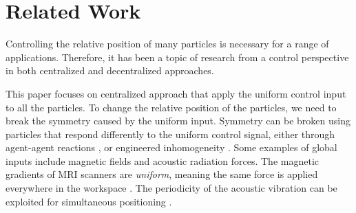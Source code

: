 
\section{Related Work}\label{sec:RelatedWork}

Controlling the relative position of many particles is necessary for a range of applications. Therefore, it has been a topic of research from a control perspective in both centralized and decentralized approaches. 

 This paper focuses on centralized approach that apply the uniform control input to all the particles. To change the relative position of the particles, we need to break the symmetry caused by the uniform input.
Symmetry can be broken using particles that respond differently to the uniform control signal, either through agent-agent reactions \cite{bertozzi2015ring}, or engineered inhomogeneity  \cite{Donald2013,bretl2007,beckerIJRR2014}. 
Some examples of global inputs include magnetic fields and acoustic radiation forces. The magnetic gradients of MRI scanners are \emph{uniform}, meaning the same force is applied everywhere in the workspace \cite{nosrati2018development}. The periodicity of the acoustic vibration can be exploited for simultaneous positioning \cite{oberti2007manipulation,zhou2016controlling}. 

 

